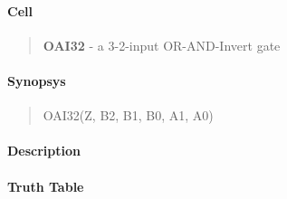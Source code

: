 \label{OAI32}
\paragraph{Cell}
\begin{quote}
    \textbf{OAI32} - a 3-2-input OR-AND-Invert gate
\end{quote}

\paragraph{Synopsys}
\begin{quote}
    OAI32(Z, B2, B1, B0, A1, A0)
\end{quote}

\paragraph{Description}



\paragraph{Truth Table}


